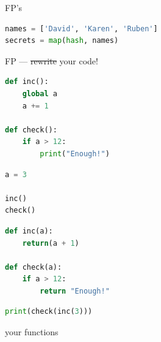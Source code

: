 \documentclass[aspectratio=169]{beamer}
\newcommand{\soutthick}[1]{%
    \renewcommand{\ULthickness}{5.4pt}%
       \sout{#1}%
    \renewcommand{\ULthickness}{.4pt}%
}
\begin{document}
\begin{frame}[fragile,t]
    \vspace{0.8em}
    \Huge{FP's }

    \begin{lstlisting}[language=Python]
names = ['David', 'Karen', 'Ruben']
secrets = map(hash, names)
    \end{lstlisting}
\end{frame}

\begin{frame}
    \HUGE
        \hspace{2.32em}\newline
        FP --- \soutthick{rewrite} your code!
\end{frame}

\begin{frame}[fragile,t]
    \begin{lstlisting}[language=Python]
def inc():
    global a
    a += 1

def check():
    if a > 12:
        print("Enough!")
    \end{lstlisting}
\end{frame}

\begin{frame}[fragile]
    \begin{lstlisting}[language=Python]
a = 3

inc()
check()
    \end{lstlisting}
\end{frame}

\begin{frame}[fragile,t]
    \begin{lstlisting}[language=Python]
def inc(a):
    return(a + 1)

def check(a):
    if a > 12:
        return "Enough!"
    \end{lstlisting}
\end{frame}

\begin{frame}[fragile]
    \begin{lstlisting}[language=Python]
print(check(inc(3)))
    \end{lstlisting}
\end{frame}

\begin{frame}
    \centering
        \Huge{ your functions}
\end{frame}

\begin{frame}[fragile]
    \begin{figure}[!h]
        \centering
    \end{figure}
\end{frame}
\end{document}
